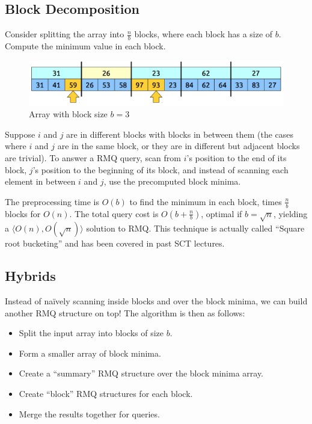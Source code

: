 \documentclass[11pt, oneside]{article}
\begin{document}
\subsection{Block Decomposition}

Consider splitting the array into \( \frac{n}{b} \) blocks, where each block
has a size of \( b \). Compute the minimum value in each block.

\begin{figure}[h!]
\centering
\includegraphics[scale=0.25]{block}
\caption{Array with block size \( b = 3 \)}
\end{figure}

Suppose \( i \) and \( j \) are in different blocks with blocks in between them
(the cases where \( i \) and \( j \) are in the same block, or they are in different but adjacent blocks
are trivial). To answer a RMQ query, scan from \( i \)'s position to the end of its block,
\( j \)'s position to the beginning of its block, and instead of scanning each element in between
\( i \) and \( j \), use the precomputed block minima.

The preprocessing time is \( O(b) \) to find the minimum in each block, times
\( \frac{n}{b} \) blocks for \( O(n) \). The total query cost is \( O(b + \frac{n}{b}) \),
optimal if \( b = \sqrt{n} \), yielding a \( \langle O(n), O(\sqrt{n}) \rangle \) solution to RMQ.
This technique is actually called ``Square root bucketing'' and has been covered in past SCT lectures.

\subsection{Hybrids}

Instead of naïvely scanning inside blocks and over the block minima, we can build another RMQ
structure on top! The algorithm is then as follows:
\begin{itemize}
  \item Split the input array into blocks of size \( b \).
  \item Form a smaller array of block minima.
  \item Create a ``summary'' RMQ structure over the block minima array.
  \item Create ``block'' RMQ structures for each block.
  \item Merge the results together for queries.
\end{itemize}
\end{document}
